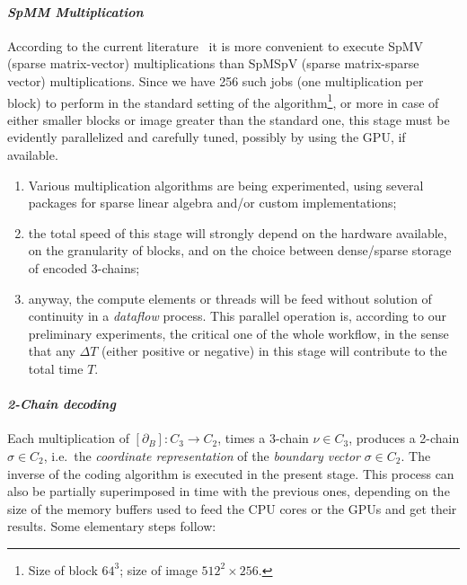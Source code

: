 \documentclass[11pt, oneside]{amsart}   	%
\begin{document}
\paragraph{\emph{SpMM Multiplication}}
According to the current literature~\cite{} it is more convenient to execute SpMV (sparse matrix-vector) multiplications than SpMSpV (sparse matrix-sparse vector) multiplications. Since we have 256 such jobs (one multiplication per block) to perform in the standard setting of the algorithm\footnote{
Size of block $64^3$; size of image $512^2\times 256$.
}, or more in case of either smaller blocks or image greater than the standard one, this stage must be evidently parallelized and carefully tuned, possibly by using the GPU, if available.
\begin{enumerate}

\item Various multiplication algorithms are being experimented, using several packages for sparse linear algebra and/or custom implementations;

\item the total speed of this stage will strongly depend on the hardware available, on the granularity of blocks, and on the choice between dense/sparse storage of encoded 3-chains;

\item anyway, the compute elements or threads will be feed without solution of continuity in a \emph{dataflow} process. This parallel operation is, according to our preliminary experiments, the critical one of the whole workflow, in the sense that any $\Delta T$ (either positive or negative) in this stage will contribute to the total time $T$.

\end{enumerate}

\paragraph{\emph{2-Chain decoding}}
Each multiplication of $[\partial_B] : C_3 \to C_2$, times a 3-chain $\nu\in C_3$, produces a 2-chain  $\sigma\in C_2$, i.e.~the \emph{coordinate representation} of the \emph{boundary vector} $\sigma\in C_2$.  The inverse of the coding algorithm is executed in the present stage.  This process can also be partially superimposed in time with the previous ones, depending on the size of the memory buffers used to feed the CPU cores or the GPUs and get their results. Some elementary steps follow:
\end{document}
